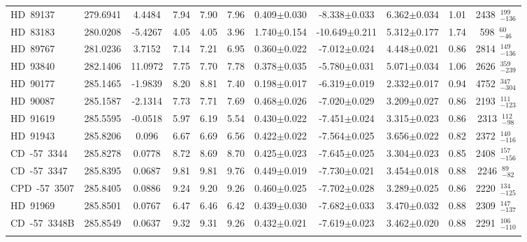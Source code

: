 {\begin{longtable}{lcccccccccc}
HD~89137 & 279.6941 & 4.4484 & 7.94 & 7.90 & 7.96 & 0.409$\pm$0.030 & -8.338$\pm$0.033 & 6.362$\pm$0.034 & 1.01 & 2438~$_{-136}^{199}$ \\
\noalign{\smallskip}
HD~83183 & 280.0208 & -5.4267 & 4.05 & 4.05 & 3.96 & 1.740$\pm$0.154 & -10.649$\pm$0.211 & 5.312$\pm$0.177 & 1.74 & 598~$_{-46}^{60}$ \\
\noalign{\smallskip}
HD~89767 & 281.0236 & 3.7152 & 7.14 & 7.21 & 6.95 & 0.360$\pm$0.022 & -7.012$\pm$0.024 & 4.448$\pm$0.021 & 0.86 & 2814~$_{-136}^{149}$ \\
\noalign{\smallskip}
HD~93840 & 282.1406 & 11.0972 & 7.75 & 7.70 & 7.78 & 0.378$\pm$0.035 & -5.780$\pm$0.031 & 5.071$\pm$0.034 & 1.06 & 2626~$_{-239}^{359}$ \\
\noalign{\smallskip}
HD~90177 & 285.1465 & -1.9839 & 8.20 & 8.81 & 7.40 & 0.198$\pm$0.017 & -6.319$\pm$0.019 & 2.332$\pm$0.017 & 0.94 & 4752~$_{-304}^{347}$ \\
\noalign{\smallskip}
HD~90087 & 285.1587 & -2.1314 & 7.73 & 7.71 & 7.69 & 0.468$\pm$0.026 & -7.020$\pm$0.029 & 3.209$\pm$0.027 & 0.86 & 2193~$_{-123}^{111}$ \\
\noalign{\smallskip}
HD~91619 & 285.5595 & -0.0518 & 5.97 & 6.19 & 5.54 & 0.430$\pm$0.022 & -7.451$\pm$0.024 & 3.315$\pm$0.023 & 0.86 & 2313~$_{-98}^{112}$ \\
\noalign{\smallskip}
HD~91943 & 285.8206 & 0.096 & 6.67 & 6.69 & 6.56 & 0.422$\pm$0.022 & -7.564$\pm$0.025 & 3.656$\pm$0.022 & 0.82 & 2372~$_{-116}^{140}$ \\
\noalign{\smallskip}
CD~-57~3344 & 285.8278 & 0.0778 & 8.72 & 8.69 & 8.70 & 0.425$\pm$0.023 & -7.645$\pm$0.025 & 3.304$\pm$0.023 & 0.85 & 2408~$_{-156}^{157}$ \\
\noalign{\smallskip}
CD~-57~3347 & 285.8395 & 0.0687 & 9.81 & 9.81 & 9.76 & 0.449$\pm$0.019 & -7.730$\pm$0.021 & 3.454$\pm$0.018 & 0.88 & 2246~$_{-82}^{89}$ \\
\noalign{\smallskip}
CPD~-57~3507 & 285.8405 & 0.0886 & 9.24 & 9.20 & 9.26 & 0.460$\pm$0.025 & -7.702$\pm$0.028 & 3.289$\pm$0.025 & 0.86 & 2220~$_{-125}^{134}$ \\
\noalign{\smallskip}
HD~91969 & 285.8501 & 0.0767 & 6.47 & 6.46 & 6.42 & 0.439$\pm$0.030 & -7.682$\pm$0.033 & 3.470$\pm$0.032 & 0.88 & 2309~$_{-137}^{147}$ \\
\noalign{\smallskip}
CD~-57~3348B & 285.8549 & 0.0637 & 9.32 & 9.31 & 9.26 & 0.432$\pm$0.021 & -7.619$\pm$0.023 & 3.462$\pm$0.020 & 0.88 & 2291~$_{-110}^{106}$ \\
\noalign{\smallskip}

\end{longtable}}
